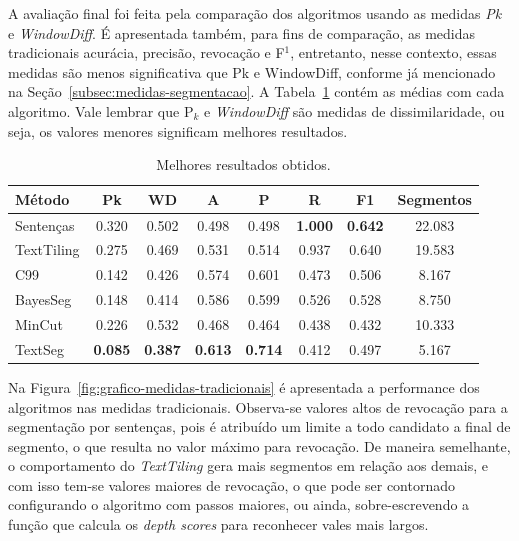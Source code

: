 A avaliação final foi feita pela comparação dos algoritmos usando as medidas \textit{Pk} e \textit{WindowDiff}. É apresentada também, para fins de comparação, as medidas tradicionais acurácia, precisão, revocação e F$^1$, entretanto, nesse contexto, essas medidas são menos significativa que Pk e WindowDiff, conforme já mencionado na Seção~\ref{subsec:medidas-segmentacao}. A Tabela~\ref{tab:configfinal} contém as médias com cada algoritmo. Vale lembrar que P$_k$ e \textit{WindowDiff} são medidas de dissimilaridade, ou seja, os valores menores significam melhores resultados.

\begin{table}[!h]
	\centering
\begin{tabular}{|l||c|c|c|c|c|c|c|} 
\hline 
\textbf{M\'{e}todo} & 
\textbf{Pk} & 
\textbf{WD} & 
\textbf{A } & 
\textbf{P } & 
\textbf{R } & 
\textbf{F1} & 
\textbf{Segmentos}\\ \hline

Senten\c{c}as & 0.320 & 0.502 & 0.498 & 0.498 & \textbf{1.000} & \textbf{0.642} & 22.083\\ \hline
TextTiling    & 0.275 & 0.469 & 0.531 & 0.514 & 0.937 & 0.640 & 19.583\\ \hline
C99           & 0.142 & 0.426 & 0.574 & 0.601 & 0.473 & 0.506 & 8.167\\ \hline
BayesSeg      & 0.148 & 0.414 & 0.586 & 0.599 & 0.526 & 0.528 & 8.750\\ \hline
MinCut        & 0.226 & 0.532 & 0.468 & 0.464 & 0.438 & 0.432 & 10.333\\ \hline
TextSeg       & \textbf{0.085} & \textbf{0.387} & \textbf{0.613} & \textbf{0.714} & 0.412 & 0.497 & 5.167\\ \hline
\end{tabular} 

	\caption{Melhores resultados obtidos.}
	\label{tab:configfinal}
\end{table}


Na Figura~\ref{fig:grafico-medidas-tradicionais} é apresentada a performance dos algoritmos nas medidas tradicionais. Observa-se valores altos de revocação para a segmentação por sentenças, pois é atribuído um limite a todo candidato a final de segmento, o que resulta no valor máximo para revocação. De maneira semelhante, o comportamento do \textit{TextTiling} gera 
mais segmentos em relação aos demais, e com isso tem-se valores maiores de revocação, o que pode ser contornado configurando o algoritmo com passos maiores, ou ainda, sobre-escrevendo a função que calcula os \textit{depth scores} para reconhecer vales mais largos.

